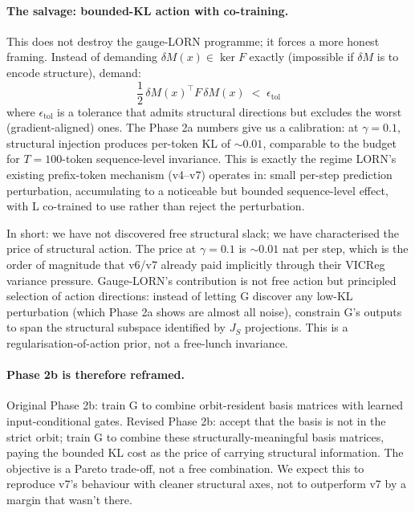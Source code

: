 \documentclass[11pt, a4paper]{article}
\theoremstyle{plain}
\theoremstyle{definition}
\theoremstyle{remark}
\begin{document}
\paragraph{The salvage: bounded-KL action with co-training.}
This does not destroy the gauge-LORN programme; it forces a more honest framing.
Instead of demanding $\delta M(x) \in \ker F$ exactly (impossible if $\delta M$ is to encode structure), demand:
\begin{equation}
\frac{1}{2}\,\delta M(x)^{\!\top} F \,\delta M(x) \;<\; \epsilon_{\text{tol}}
\end{equation}
where $\epsilon_{\text{tol}}$ is a tolerance that admits structural directions but excludes the worst (gradient-aligned) ones.
The Phase 2a numbers give us a calibration: at $\gamma = 0.1$, structural injection produces per-token KL of $\sim 0.01$, comparable to the budget for $T=100$-token sequence-level invariance.
This is exactly the regime LORN's existing prefix-token mechanism (v4--v7) operates in: small per-step prediction perturbation, accumulating to a noticeable but bounded sequence-level effect, with L co-trained to use rather than reject the perturbation.

In short: we have not discovered free structural slack; we have characterised the price of structural action.
The price at $\gamma = 0.1$ is $\sim 0.01$ nat per step, which is the order of magnitude that v6/v7 already paid implicitly through their VICReg variance pressure.
Gauge-LORN's contribution is not free action but principled selection of action directions: instead of letting G discover any low-KL perturbation (which Phase 2a shows are almost all noise), constrain G's outputs to span the structural subspace identified by $J_S$ projections.
This is a regularisation-of-action prior, not a free-lunch invariance.

\paragraph{Phase 2b is therefore reframed.}
Original Phase 2b: train G to combine orbit-resident basis matrices with learned input-conditional gates.
Revised Phase 2b: accept that the basis is not in the strict orbit; train G to combine these structurally-meaningful basis matrices, paying the bounded KL cost as the price of carrying structural information.
The objective is a Pareto trade-off, not a free combination.
We expect this to reproduce v7's behaviour with cleaner structural axes, not to outperform v7 by a margin that wasn't there.
\end{document}

